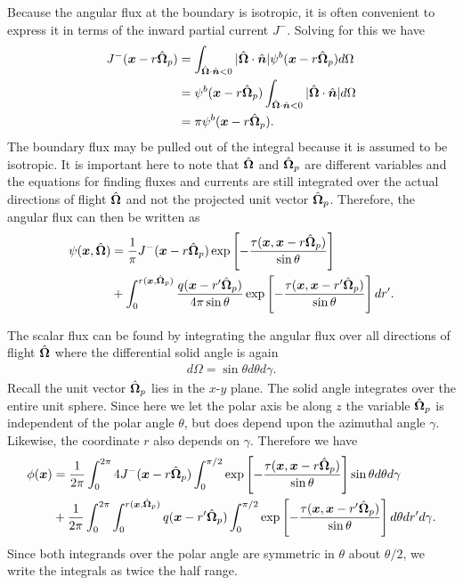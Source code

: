 Because the angular flux at the boundary is isotropic, it is often convenient to express it in terms of the inward partial current $J^-$. Solving for this we have
\begin{align}
  J^-(\bm{x} - r \hat{\mathbf{\Omega}}_p) 
  &= \int_{\hat{\mathbf{\Omega}} \cdot \hat{\bm{n}} < 0} | \hat{\mathbf{\Omega}} \cdot \hat{\bm{n}} |  \psi^b( \bm{x} - r \hat{\mathbf{\Omega}}_p ) d\Omega \nonumber \\*
  &= \psi^b( \bm{x} - r \hat{\mathbf{\Omega}}_p ) \int_{\hat{\mathbf{\Omega}} \cdot \hat{\bm{n}} < 0} | \hat{\mathbf{\Omega}} \cdot \hat{\bm{n}} | d\Omega  \nonumber \\*
  &= \pi \psi^b( \bm{x} - r \hat{\mathbf{\Omega}}_p ).
\end{align}
The boundary flux may be pulled out of the integral because it is assumed to be isotropic. It is important here to note that $\hat{\mathbf{\Omega}}$ and $\hat{\mathbf{\Omega}}_p$ are different variables and the equations for finding fluxes and currents are still integrated over the actual directions of flight $\hat{\mathbf{\Omega}}$ and not the projected unit vector $\hat{\mathbf{\Omega}}_p$. Therefore, the angular flux can then be written as
\begin{align}
  \psi(\bm{x},\hat{\mathbf{\Omega}}) 
  &= \frac{1}{\pi} J^-(\bm{x} - r \hat{\mathbf{\Omega}}_p) \exp\left[ -\frac{\tau(\bm{x},\bm{x} - r \hat{\mathbf{\Omega}}_p)}{\sin\theta} \right] \nonumber \\
  &+ \int_0^{r(\bm{x},\hat{\mathbf{\Omega}}_p)} \frac{q( \bm{x} - r' \hat{\mathbf{\Omega}}_p )}{4\pi \sin\theta } \exp\left[ -\frac{\tau(\bm{x},\bm{x} - r' \hat{\mathbf{\Omega}}_p)}{\sin\theta} \right] dr'.
\end{align}

The scalar flux can be found by integrating the angular flux over all directions of flight $\hat{\mathbf{\Omega}}$ where the differential solid angle is again
\begin{align}
  d\Omega = \sin\theta d\theta d\gamma.
\end{align}
Recall the unit vector $\hat{\mathbf{\Omega}}_p$ lies in the $x$-$y$ plane. The solid angle integrates over the entire unit sphere. Since here we let the polar axis be along $z$  the variable $\hat{\mathbf{\Omega}}_p$ is independent of the polar angle $\theta$, but does depend upon the azimuthal angle $\gamma$. Likewise, the coordinate $r$ also depends on $\gamma$. Therefore we have
\begin{align}
  \phi(\bm{x}) &= \frac{1}{2\pi} \int_0^{2\pi} 4 J^-(\bm{x} - r \hat{\mathbf{\Omega}}_p) \int_0^{\pi/2} \exp\left[ -\frac{\tau(\bm{x},\bm{x} - r \hat{\mathbf{\Omega}}_p)}{\sin\theta} \right] \sin\theta d\theta d\gamma \nonumber \\*
  &+ \frac{1}{2\pi} \int_0^{2\pi} \int_0^{r(\bm{x},\hat{\mathbf{\Omega}}_p)} q( \bm{x} - r' \hat{\mathbf{\Omega}}_p ) \int_0^{\pi/2} \exp\left[ -\frac{\tau(\bm{x},\bm{x} - r' \hat{\mathbf{\Omega}}_p)}{\sin\theta} \right] d\theta dr' d\gamma.
\end{align}
Since both integrands over the polar angle are symmetric in $\theta$ about $\theta/2$, we write the integrals as twice the half range.

